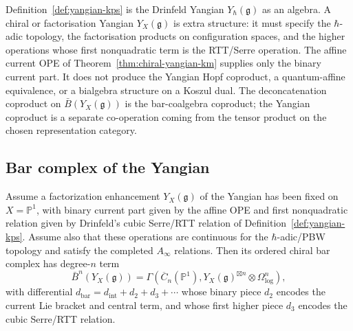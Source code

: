 \begin{remark}
\label{rem:yangian-factorization-scope}
Definition~\ref{def:yangian-kps} is the Drinfeld Yangian
$Y_\hbar(\mathfrak g)$ as an algebra.  A chiral or factorisation
Yangian $Y_X(\mathfrak g)$ is extra structure: it must specify the
$\hbar$-adic topology, the factorisation products on
configuration spaces, and the higher operations whose first
nonquadratic term is the RTT/Serre operation.  The affine current OPE
of Theorem~\ref{thm:chiral-yangian-km} supplies only the binary
current part.  It does not produce the Yangian Hopf coproduct, a
quantum-affine equivalence, or a bialgebra structure on a Koszul dual.
The deconcatenation coproduct on $\bar B(Y_X(\mathfrak g))$ is the
bar-coalgebra coproduct; the Yangian coproduct is a separate
co-operation coming from the tensor product on the chosen
representation category.
\end{remark}

\subsection{Bar complex of the Yangian}

\begin{theorem}
\label{thm:yangian-bar-complex-structure}
Assume a factorization enhancement $Y_X(\mathfrak g)$ of the
Yangian has been fixed on $X=\mathbb P^1$, with binary current
part given by the affine OPE and first nonquadratic relation given
by Drinfeld's cubic Serre/RTT relation of
Definition~\textup{\ref{def:yangian-kps}}.  Assume also that these
operations are continuous for the $\hbar$-adic/PBW topology and
satisfy the completed $A_\infty$ relations.  Then its ordered chiral
bar complex has degree-$n$ term
\[
\bar{B}^n(Y_X(\mathfrak{g})) =
\Gamma\left(\overline{C}_n(\mathbb{P}^1),
Y_X(\mathfrak{g})^{\boxtimes n} \otimes \Omega^n_{\log}\right),
\]
with differential
$d_{\mathrm{bar}}=d_{\mathrm{int}}+d_2+d_3+\cdots$ whose binary
piece $d_2$ encodes the current Lie bracket and central term, and
whose first higher piece $d_3$ encodes the cubic Serre/RTT relation.
\end{theorem}

